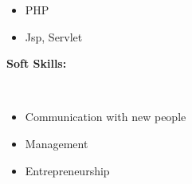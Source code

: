 \documentclass[12pt,a4paper,english]{article}
\begin{document}
\begin{flushleft}
\begin{itemize}
\begin{itemize}
				\item PHP
				\item Jsp, Servlet
			\end{itemize}
		\end{itemize}
		\vspace{1.5in}
		\begin{Large}
			\textbf{Soft Skills:}
		\end{Large}\\
		\begin{itemize}
			\item Communication with new people
			\item Management
			\item Entrepreneurship
		\end{itemize}
	\end{flushleft}
\end{document}
